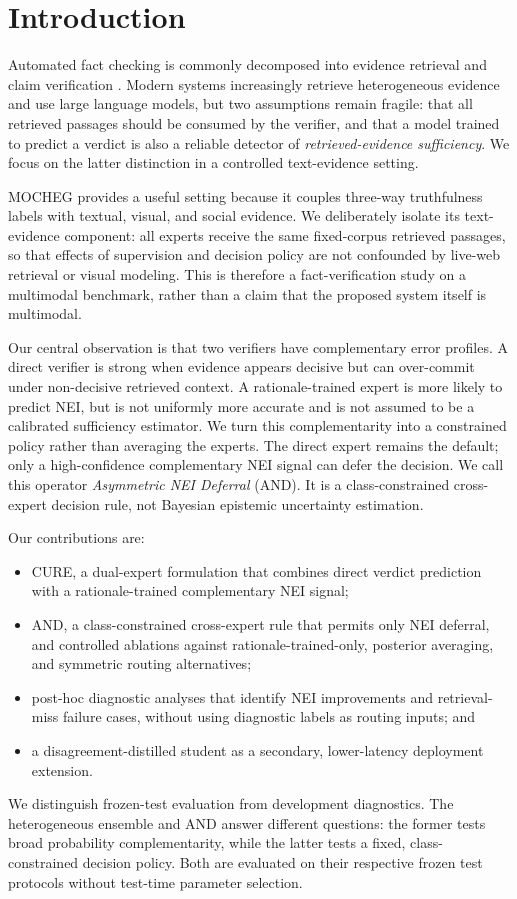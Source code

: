 \documentclass[11pt]{article}
\begin{document}
\section{Introduction}
Automated fact checking is commonly decomposed into evidence retrieval and claim verification \citep{guo2022survey,thorne2018fever}. Modern systems increasingly retrieve heterogeneous evidence and use large language models, but two assumptions remain fragile: that all retrieved passages should be consumed by the verifier, and that a model trained to predict a verdict is also a reliable detector of \emph{retrieved-evidence sufficiency}. We focus on the latter distinction in a controlled text-evidence setting.

MOCHEG \citep{yao2023mocheg} provides a useful setting because it couples three-way truthfulness labels with textual, visual, and social evidence. We deliberately isolate its text-evidence component: all experts receive the same fixed-corpus retrieved passages, so that effects of supervision and decision policy are not confounded by live-web retrieval or visual modeling. This is therefore a fact-verification study on a multimodal benchmark, rather than a claim that the proposed system itself is multimodal.

Our central observation is that two verifiers have complementary error profiles. A direct verifier is strong when evidence appears decisive but can over-commit under non-decisive retrieved context. A rationale-trained expert is more likely to predict \textsc{NEI}, but is not uniformly more accurate and is not assumed to be a calibrated sufficiency estimator. We turn this complementarity into a constrained policy rather than averaging the experts. The direct expert remains the default; only a high-confidence complementary \textsc{NEI} signal can defer the decision. We call this operator \emph{Asymmetric NEI Deferral} (AND). It is a class-constrained cross-expert decision rule, not Bayesian epistemic uncertainty estimation.

Our contributions are:
\begin{itemize}
\item \textsc{CURE}, a dual-expert formulation that combines direct verdict prediction with a rationale-trained complementary \textsc{NEI} signal;
\item AND, a class-constrained cross-expert rule that permits only \textsc{NEI} deferral, and controlled ablations against rationale-trained-only, posterior averaging, and symmetric routing alternatives;
\item post-hoc diagnostic analyses that identify \textsc{NEI} improvements and retrieval-miss failure cases, without using diagnostic labels as routing inputs; and
\item a disagreement-distilled student as a secondary, lower-latency deployment extension.
\end{itemize}
We distinguish frozen-test evaluation from development diagnostics. The heterogeneous ensemble and AND answer different questions: the former tests broad probability complementarity, while the latter tests a fixed, class-constrained decision policy. Both are evaluated on their respective frozen test protocols without test-time parameter selection.
\end{document}
